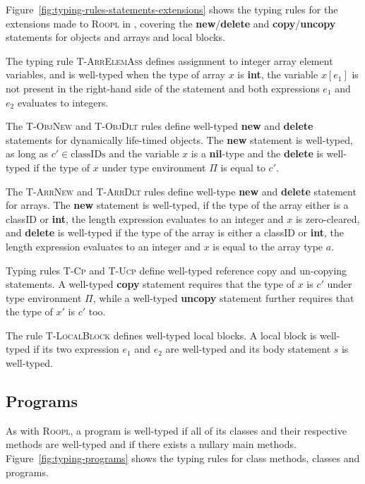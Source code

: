 Figure~\ref{fig:typing-rules-statements-extensions} shows the typing rules for the extensions made to \textsc{Roopl} in \rooplpp, covering the \textbf{new}/\textbf{delete} and \textbf{copy}/\textbf{uncopy} statements for objects and arrays and local blocks.

The typing rule \textsc{T-ArrElemAss} defines assignment to integer array element variables, and is well-typed when the type of array $x$ is \textbf{int}, the variable $x[e_1]$ is not present in the right-hand side of the statement and both expressions $e_1$ and $e_2$ evaluates to integers.

The \textsc{T-ObjNew} and \textsc{T-ObjDlt} rules define well-typed \textbf{new} and \textbf{delete} statements for dynamically life-timed objects. The \textbf{new} statement is well-typed, as long as $c' \in \text{classIDs}$ and the variable $x$ is a \textbf{nil}-type and the \textbf{delete} is well-typed if the type of $x$ under type environment $\Pi$ is equal to $c'$.

The \textsc{T-ArrNew} and \textsc{T-ArrDlt} rules define well-type \textbf{new} and \textbf{delete} statement for \rooplpp arrays. The \textbf{new} statement is well-typed, if the type of the array either is a classID or \textbf{int}, the length expression evaluates to an integer and $x$ is zero-cleared, and \textbf{delete} is well-typed if the type of the array is either a classID or \textbf{int}, the length expression evaluates to an integer and $x$ is equal to the array type $a$.

Typing rules \textsc{T-Cp} and \textsc{T-Ucp} define well-typed reference copy and un-copying statements. A well-typed \textbf{copy} statement requires that the type of $x$ is $c'$ under type environment $\Pi$, while a well-typed \textbf{uncopy} statement further requires that the type of $x'$ is $c'$ too.

The rule \textsc{T-LocalBlock} defines well-typed local blocks. A local block is well-typed if its two expression $e_1$ and $e_2$ are well-typed and its body statement $s$ is well-typed. 

\subsection{Programs}
\label{subsec:programs} 
As with \textsc{Roopl}, a \rooplpp program is well-typed if all of its classes and their respective methods are well-typed and if there exists a nullary main methods. Figure~\ref{fig:typing-programs} shows the typing rules for class methods, classes and programs.

